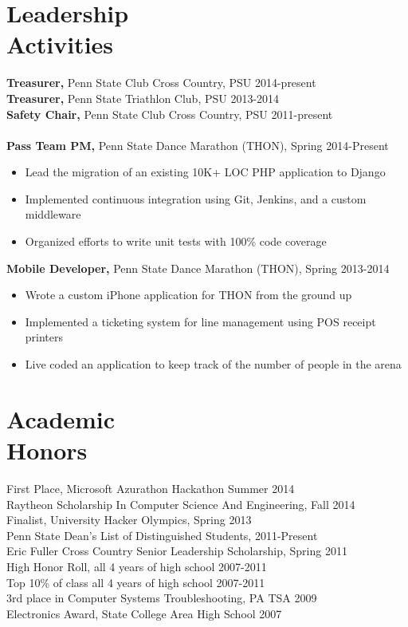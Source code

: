 \documentclass[margin]{res}
\begin{document}
\begin{resume}
\section{Leadership \\ Activities}
{\bf Treasurer,} Penn State Club Cross Country, PSU \hfill 2014-present \\
{\bf Treasurer,} Penn State Triathlon Club, PSU \hfill 2013-2014 \\
{\bf Safety Chair,} Penn State Club Cross Country, PSU \hfill 2011-present \\ \\
{\bf Pass Team PM,} Penn State Dance Marathon (THON), \hfill Spring 2014-Present
\begin{itemize} \itemsep -2pt %
\item Lead the migration of an existing 10K+ LOC PHP application to Django
\item Implemented continuous integration using Git, Jenkins, and a custom middleware
\item Organized efforts to write unit tests with 100\% code coverage
\end{itemize}
{\bf Mobile Developer,} Penn State Dance Marathon (THON), \hfill Spring 2013-2014
\begin{itemize} \itemsep -2pt %
\item Wrote a custom iPhone application for THON from the ground up
\item Implemented a ticketing system for line management using POS receipt printers
\item Live coded an application to keep track of the number of people in the arena
\end{itemize}
\section{Academic \\ Honors}
First Place, Microsoft Azurathon Hackathon \hfill Summer 2014\\
Raytheon Scholarship In Computer Science And Engineering, \hfill Fall 2014\\
Finalist, University Hacker Olympics, \hfill Spring 2013\\
Penn State Dean's List of Distinguished Students, \hfill 2011-Present \\
Eric Fuller Cross Country Senior Leadership Scholarship, \hfill Spring 2011 \\
High Honor Roll, all 4 years of high school \hfill 2007-2011 \\
Top 10\% of class all 4 years of high school \hfill 2007-2011 \\
3rd place in Computer Systems Troubleshooting, PA TSA \hfill 2009 \\
Electronics Award, State College Area High School \hfill 2007


\end{resume}
\end{document}

